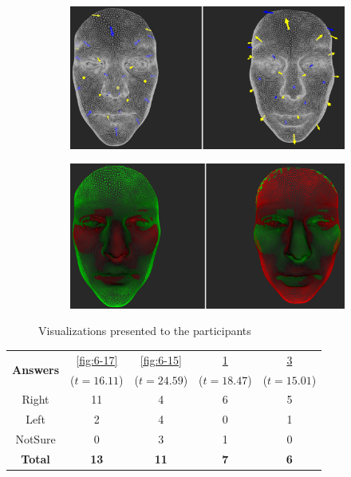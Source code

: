 \begin{figure}[h]
\begin{subfigure}{0.4\textwidth}
\includegraphics[width=\textwidth]{./screenshots/pair18.PNG}
\caption{}
\label{fig:6-18}
\end{subfigure}
\quad
\begin{subfigure}{0.4\textwidth}
\includegraphics[width=\textwidth]{./screenshots/pair16.PNG}
\caption{}
\label{fig:6-16}
\end{subfigure}
\caption{Visualizations presented to the participants}
\end{figure}
\medskip
\begin{center}
\begin{tabular}{| c | c | c | c | c |}
	\hline
\multirow{2}{*}{\bf Answers} & \ref{fig:6-17} & \ref{fig:6-15} & \ref{fig:6-18} & \ref{fig:6-16}\\
	&  (\(t=16.11\)) &  (\(t=24.59\)) &  (\(t=18.47\)) &  (\(t=15.01\))\\ \hline
	Right & 11 & 4 & 6 & 5\\ \hline
	Left & 2 & 4 & 0 & 1\\ \hline
	NotSure & 0 & 3 & 1 & 0\\ \hline
	{\bf Total} & {\bf 13} & {\bf 11} & {\bf 7} & {\bf 6}\\ \hline
\end{tabular}
\end{center}
\clearpage

